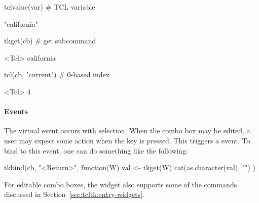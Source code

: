 \begin{Schunk}
\begin{Sinput}
 tclvalue(var)                           # TCL variable
\end{Sinput}
\begin{Soutput}
[1] "california"
\end{Soutput}
\begin{Sinput}
 tkget(cb)                               # get subcommand
\end{Sinput}
\begin{Soutput}
<Tcl> california 
\end{Soutput}
\begin{Sinput}
 tcl(cb, "current")                      # 0-based index
\end{Sinput}
\begin{Soutput}
<Tcl> 4 
\end{Soutput}
\end{Schunk}


\paragraph{Events}
The virtual event  occurs with
selection. When the combo box may be edited, a user may expect some
action when the  key is pressed. This triggers a
 event. To bind to this event, one can do something
like the following:

\begin{Schunk}
\begin{Sinput}
 tkbind(cb, "<Return>", function(W) {
   val <- tkget(W)
   cat(as.character(val), "\n")
 })
\end{Sinput}
\end{Schunk}

For editable combo boxes, the widget also supports some of the
 commands discussed in
Section~\ref{sec:tcltk:entry-widgets}.






